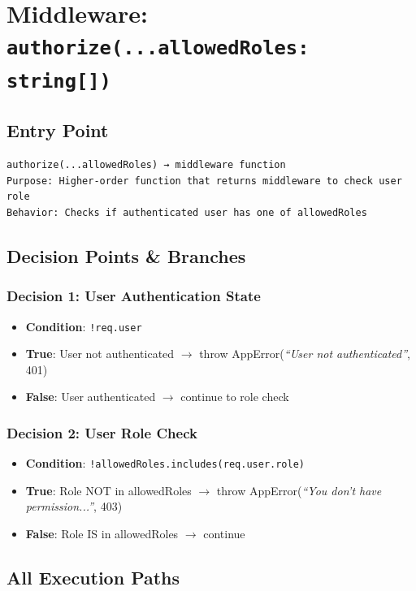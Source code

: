 \section{Middleware: \texttt{authorize(...allowedRoles: string[])}}

\subsection{Entry Point}
\begin{verbatim}
authorize(...allowedRoles) → middleware function
Purpose: Higher-order function that returns middleware to check user role
Behavior: Checks if authenticated user has one of allowedRoles
\end{verbatim}

\subsection{Decision Points \& Branches}

\subsubsection{Decision 1: User Authentication State}
\begin{itemize}
    \item \textbf{Condition}: \texttt{!req.user}
    \item \textbf{True}: User not authenticated $\rightarrow$ throw AppError(\textit{``User not authenticated''}, 401)
    \item \textbf{False}: User authenticated $\rightarrow$ continue to role check
\end{itemize}

\subsubsection{Decision 2: User Role Check}
\begin{itemize}
    \item \textbf{Condition}: \texttt{!allowedRoles.includes(req.user.role)}
    \item \textbf{True}: Role NOT in allowedRoles $\rightarrow$ throw AppError(\textit{``You don't have permission...''}, 403)
    \item \textbf{False}: Role IS in allowedRoles $\rightarrow$ continue
\end{itemize}

\subsection{All Execution Paths}

